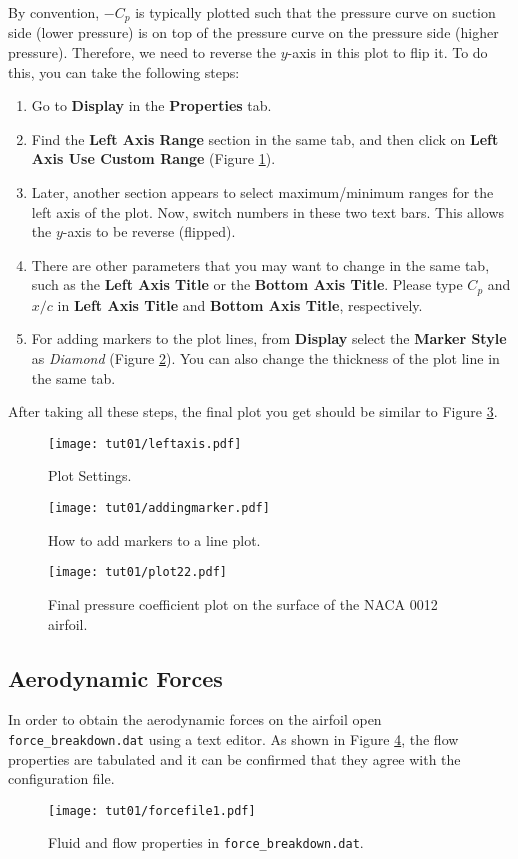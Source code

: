 By convention, $-C_p$ is typically plotted such that the pressure curve on suction side (lower pressure) is on top of the pressure curve on the pressure side (higher pressure). Therefore, we need to reverse the $y$-axis in this plot to flip it. To do this, you can take the following steps:
\begin{enumerate}[label=\arabic*)]
	\setcounter{enumi}{0}
	\item Go to \textbf{Display} in the \textbf{Properties} tab.
	\item Find the \textbf{Left Axis Range} section in the same tab, and then click on \textbf{Left Axis Use Custom Range} (Figure \ref{fig1:viewsetting}). 
	\item Later, another section appears to select maximum/minimum ranges for the left axis of the plot. Now, switch numbers in these two text bars. This allows the $y$-axis to be reverse (flipped).
	\item There are other parameters that you may want to change in the same tab, such as the \textbf{Left Axis Title} or the \textbf{Bottom Axis Title}. Please type $C_p$ and $x/c$ in \textbf{Left Axis Title} and \textbf{Bottom Axis Title}, respectively.
	\item For adding markers to the plot lines, from \textbf{Display} select the \textbf{Marker Style} as \textit{Diamond} (Figure \ref{fig1:marker}). You can also change the thickness of the plot line in the same tab.
\end{enumerate}
After taking all these steps, the final plot you get should be similar to Figure \ref{fig1:surface_pressure2}.
\begin{figure}[ht]
    \centering
    \texttt{[image: tut01/leftaxis.pdf]}
    \caption{Plot Settings.}
    \label{fig1:viewsetting}
\end{figure}
\begin{figure}[H]
    \centering
    \texttt{[image: tut01/addingmarker.pdf]}
    \caption{How to add markers to a line plot.}
    \label{fig1:marker}
\end{figure}

\begin{figure}[ht]
    \centering
    \texttt{[image: tut01/plot22.pdf]}
    \caption{Final pressure coefficient plot on the surface of the NACA 0012 airfoil.}
    \label{fig1:surface_pressure2}
\end{figure}
\subsection{Aerodynamic Forces}
In order to obtain the aerodynamic forces on the airfoil open \texttt{force\_breakdown.dat} using a text editor. As shown in Figure \ref{fig1:forcefile1}, the flow properties are tabulated and it can be confirmed that they agree with the configuration file. 
\begin{figure}[ht]
    \centering
    \texttt{[image: tut01/forcefile1.pdf]}
    \caption{Fluid and flow properties in \texttt{force\_breakdown.dat}.}
    \label{fig1:forcefile1}
\end{figure}

